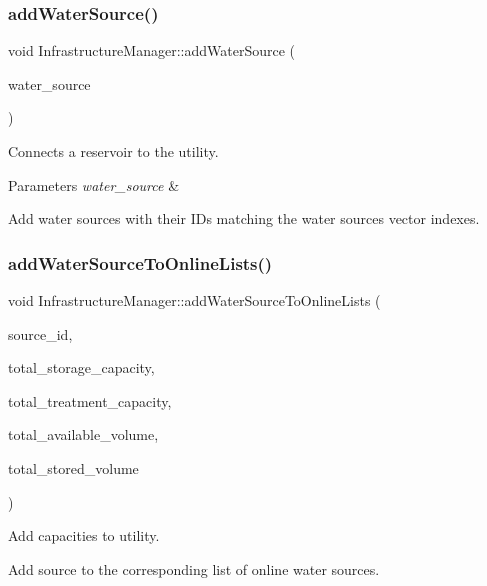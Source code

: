 \subsubsection{\texorpdfstring{add\+Water\+Source()}{addWaterSource()}}
{\footnotesize\ttfamily void Infrastructure\+Manager\+::add\+Water\+Source (\begin{DoxyParamCaption}\item[{\mbox{\hyperlink{classWaterSource}{Water\+Source}} $\ast$}]{water\+\_\+source }\end{DoxyParamCaption})}

Connects a reservoir to the utility. 
\begin{DoxyParams}{Parameters}
{\em water\+\_\+source} & \\
\hline
\end{DoxyParams}
Add water sources with their I\+Ds matching the water sources vector indexes. \mbox{\label{classInfrastructureManager_ab66bdc91a6f60c6aea6ce0bf179df913_ab66bdc91a6f60c6aea6ce0bf179df913}} 
\subsubsection{\texorpdfstring{add\+Water\+Source\+To\+Online\+Lists()}{addWaterSourceToOnlineLists()}}
{\footnotesize\ttfamily void Infrastructure\+Manager\+::add\+Water\+Source\+To\+Online\+Lists (\begin{DoxyParamCaption}\item[{int}]{source\+\_\+id,  }\item[{double \&}]{total\+\_\+storage\+\_\+capacity,  }\item[{double \&}]{total\+\_\+treatment\+\_\+capacity,  }\item[{double \&}]{total\+\_\+available\+\_\+volume,  }\item[{double \&}]{total\+\_\+stored\+\_\+volume }\end{DoxyParamCaption})}

Add capacities to utility.

Add source to the corresponding list of online water sources. \mbox{\label{classInfrastructureManager_a7d60e4abff73890519ced487c74f2675_a7d60e4abff73890519ced487c74f2675}} 
